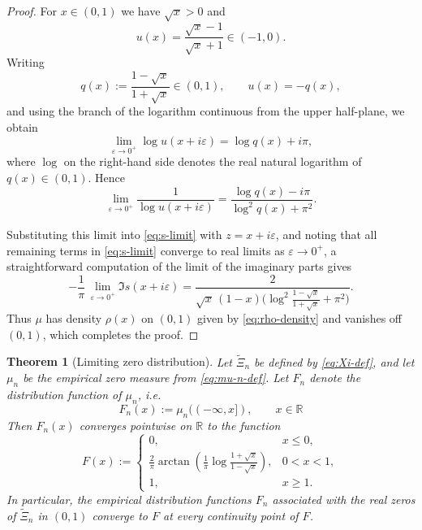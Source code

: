 \documentclass[12pt,twoside]{article}
\newtheorem{theorem}{Theorem}[section]
\begin{document}
\begin{proof}
For $x\in(0,1)$ we have $\sqrt{x}>0$ and
\[
  u(x) = \frac{\sqrt{x}-1}{\sqrt{x}+1} \in (-1,0).
\]
Writing
\[
  q(x):=\frac{1-\sqrt{x}}{1+\sqrt{x}}\in(0,1),
  \qquad u(x) = -q(x),
\]
and using the branch of the logarithm continuous from the upper
half-plane, we obtain
\[
  \lim_{\varepsilon\rightarrow 0^+}\log u(x+i\varepsilon)
  =
  \log q(x) + i\pi,
\]
where $\log$ on the right-hand side denotes the real natural logarithm
of $q(x)\in(0,1)$.  Hence
\[
  \lim_{\varepsilon\rightarrow 0^+}\frac{1}{\log u(x+i\varepsilon)}
  =
  \frac{\log q(x) - i\pi}{\log^2 q(x) + \pi^2}.
\]

Substituting this limit into \eqref{eq:s-limit} with $z=x+i\varepsilon$,
and noting that all remaining terms in \eqref{eq:s-limit} converge to
real limits as $\varepsilon\rightarrow 0^+$, a straightforward computation
of the limit of the imaginary parts gives
\[
  -\frac{1}{\pi}\,\lim_{\varepsilon\rightarrow 0^+}\Im s(x+i\varepsilon)
  =
  \frac{2}{
    \sqrt{x}\,(1-x)
    \bigl(\log^2\!\tfrac{1-\sqrt{x}}{1+\sqrt{x}} + \pi^2\bigr)
  }.
\]
Thus $\mu$ has density $\rho(x)$ on $(0,1)$ given by \eqref{eq:rho-density}
and vanishes off $(0,1)$, which completes the proof.
\end{proof}

\begin{theorem}[Limiting zero distribution]\label{thm:limiting-zero-distribution}
Let $\widetilde{\Xi}_n$ be defined by \eqref{eq:Xi-def}, and let
$\mu_n$ be the empirical zero measure from \eqref{eq:mu-n-def}.
Let $F_n$ denote the distribution function of $\mu_n$, i.e.
\[
F_n(x):=\mu_n((-\infty,x]),\qquad x\in\mathbb{R}
\]
Then $F_n(x)$ converges pointwise on $\mathbb{R}$ to the function
\[
F(x):=
\begin{cases}
0, & x\le 0,\\[1mm]
\displaystyle \frac{2}{\pi}\arctan\!\left(
  \frac{1}{\pi}\log\frac{1+\sqrt{x}}{1-\sqrt{x}}
\right), & 0<x<1,\\[3mm]
1, & x\ge 1.
\end{cases}
\]
In particular, the empirical distribution functions $F_n$ associated
with the real zeros of $\widetilde{\Xi}_n$ in $(0,1)$ converge to $F$
at every continuity point of $F$.
\end{theorem}
\end{document}
